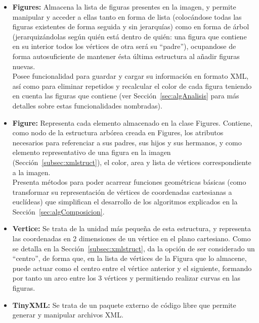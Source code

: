 	\begin{itemize}
	
		\item \textbf{Figures:} Almacena la lista de figuras presentes en la imagen, y permite manipular y acceder a ellas tanto en forma de lista (colocándose todas las figuras existentes de forma seguida y sin jerarquías) como en forma de árbol (jerarquizándolas según quién está dentro de quién: una figura que contiene en su interior todos los vértices de otra será su ``padre''), ocupandose de forma autosuficiente de mantener ésta última estructura al añadir figuras nuevas.\\
	
		Posee funcionalidad para guardar y cargar su información en formato XML, así como para eliminar repetidos y recalcular el color de cada figura teniendo en cuenta las figuras que contiene (ver Sección~\ref{sec:algAnalisis} para más detalles sobre estas funcionalidades nombradas).
		
		\item \textbf{Figure:} Representa cada elemento almacenado en la clase Figures. Contiene, como nodo de la estructura arbórea creada en Figures, los atributos necesarios para referenciar a sus padres, sus hijos y sus hermanos, y como elemento representativo de una figura en la imagen (Sección~\ref{subsec:xmlstruct}), el color, area y lista de vértices correspondiente a la imagen.\\
		
		Presenta métodos para poder acarrear funciones geométricas básicas (como transformar su representación de vértices de coordenadas cartesianas a euclídeas) que simplifican el desarrollo de los algoritmos explicados en la Sección~\ref{sec:algComposicion}.
		
		\item \textbf{Vertice:} Se trata de la unidad más pequeña de esta estructura, y representa las coordenadas en 2 dimensiones de un vértice en el plano cartesiano. Como se detalla en la Sección~\ref{subsec:xmlstruct}, da la opción de ser considerado un ``centro'', de forma que, en la lista de vértices de la Figura que lo almacene, puede actuar como el centro entre el vértice anterior y el siguiente, formando por tanto un arco entre los 3 vértices y permitiendo realizar curvas en las figuras.
		
		\item \textbf{TinyXML:} Se trata de un paquete externo de código libre que permite generar y manipular archivos XML.
	
	\end{itemize}
	
